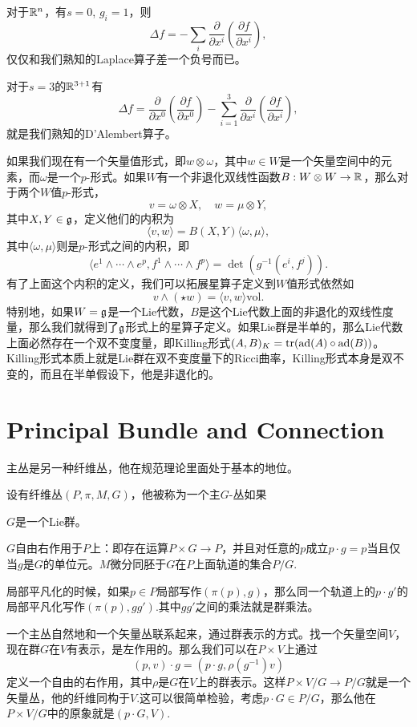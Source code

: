 对于$\mathbb{R}^n$，有$s=0$, $g_i=1$，则
\[
	\Delta f=-\sum_i\frac{\partial}{\partial x^i}\left(\frac{\partial f}{\partial x^i}\right),
\]
仅仅和我们熟知的Laplace算子差一个负号而已。

对于$s=3$的$\mathbb{R}^{3+1}$有
\[
	\Delta f=\frac{\partial}{\partial x^0}\left(\frac{\partial f}{\partial x^0}\right)-\sum_{i=1}^3\frac{\partial}{\partial x^i}\left(\frac{\partial f}{\partial x^i}\right),
\]
就是我们熟知的D'Alembert算子。

如果我们现在有一个矢量值形式，即$w\otimes \omega$，其中$w\in W$是一个矢量空间中的元素，而$\omega$是一个$p$-形式。如果$W$有一个非退化双线性函数$B:W\otimes W\to \mathbb{R}$，那么对于两个$W$值$p$-形式，
\[
	v=\omega\otimes X,\quad w=\mu\otimes Y,
\]
其中$X,Y\in {\mathfrak{g}}$，定义他们的内积为
\[
	\langle v,w\rangle=B(X,Y) \langle\omega,\mu\rangle,
\]
其中$\langle\omega,\mu\rangle$则是$p$-形式之间的内积，即
\[
	\langle e^1\wedge\cdots \wedge e^p,f^1\wedge\cdots \wedge f^p\rangle =\det(g^{-1}(e^i,f^j)).
\]
有了上面这个内积的定义，我们可以拓展星算子定义到$W$值形式依然如
\[
	v\wedge(\star w)=\langle v,w\rangle \mathrm{vol}.
\]
特别地，如果$W={\mathfrak{g}}$是一个Lie代数，$B$是这个Lie代数上面的非退化的双线性度量，那么我们就得到了${\mathfrak{g}}$形式上的星算子定义。如果Lie群是半单的，那么Lie代数上面必然存在一个双不变度量，即Killing形式$(A,B)_K=\operatorname{tr}({\mathrm{ad}}(A)\circ {\mathrm{ad}}(B))$。Killing形式本质上就是Lie群在双不变度量下的Ricci曲率，Killing形式本身是双不变的，而且在半单假设下，他是非退化的。


\section{Principal Bundle and Connection}
主丛是另一种纤维丛，他在规范理论里面处于基本的地位。

\para 设有纤维丛$(P,\pi,M,G)$，他被称为一个主$G$-丛如果

	 $G$是一个Lie群。

	 $G$自由右作用于$P$上：即存在运算$P\times G\to P$，并且对任意的$p$成立$p\cdot g=p$当且仅当$g$是$G$的单位元。$M$微分同胚于$G$在$P$上面轨道的集合$P/G$.

	 局部平凡化的时候，如果$p\in P$局部写作$(\pi(p),g)$，那么同一个轨道上的$p\cdot g'$的局部平凡化写作$(\pi(p),gg')$.其中$gg'$之间的乘法就是群乘法。


一个主丛自然地和一个矢量丛联系起来，通过群表示的方式。找一个矢量空间$V$，现在群$G$在$V$有表示，是左作用的。那么我们可以在$P\times V$上通过
\[
	(p,v)\cdot g=(p\cdot g,\rho(g^{-1})v)
\]
定义一个自由的右作用，其中$\rho$是$G$在$V$上的群表示。这样$P\times V/G\to P/G$就是一个矢量丛，他的纤维同构于$V$.这可以很简单检验，考虑$p\cdot G\in P/G$，那么他在$P\times V/G$中的原象就是$(p\cdot G,V)$.

